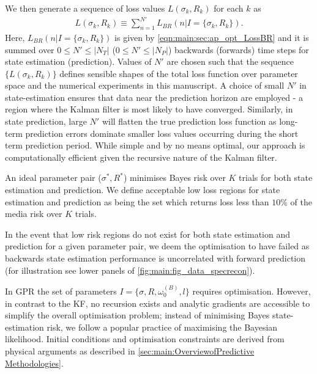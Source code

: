 We then generate a sequence of loss values $L(\sigma_k, R_k)$ for each $k$ as
\begin{align}
L(\sigma_k, R_k) \equiv  \sum_{n=1}^{N'} L_{BR}(n | I= \{\sigma_k, R_k \}).
\end{align}
Here, $L_{BR}(n | I= \{\sigma_k, R_k \})$ is given by \cref{eqn:main:sec:ap_opt_LossBR} and it is summed over $0\leq N'\leq |N_{T}|$  ($0\leq N'\leq |N_{P}|$) backwards (forwards) time steps for state estimation (prediction). Values of $N'$ are chosen such that the sequence $\{L(\sigma_k, R_k) \}$ defines sensible shapes of the total loss function over parameter space and the numerical experiments in this manuscript. A choice of small $N'$ in state-estimation ensures that data near the prediction horizon are employed - a region where the Kalman filter is most likely to have converged.  Similarly, in state prediction, large $N'$ will flatten the true prediction loss function as long-term prediction errors dominate smaller loss values occurring during the short term prediction period.  While simple and by no means optimal, our approach is computationally efficient given the recursive nature of the Kalman filter.%

An ideal parameter pair ($\sigma^*, R^*$) minimises Bayes risk over $K$ trials for both state estimation and prediction.  We define acceptable low loss regions for state estimation and prediction as being the set which returns loss less than $10\%$ of the media risk over $K$ trials.  

In the event that low risk regions do not exist for both state estimation and prediction for a given parameter pair, we deem the optimisation to have failed as backwards state estimation performance is uncorrelated with forward prediction (for illustration see lower panels of \cref{fig:main:fig_data_specrecon}).

In GPR the set of parameters $I = \{\sigma, R, \omega_0^{(B)}, l \}$ requires optimisation.  However, in contrast to the KF, no recursion exists and analytic gradients are accessible to simplify the overall optimisation problem; instead of minimising Bayes state-estimation risk, we follow a popular practice of maximising the Bayesian likelihood. Initial conditions and optimisation constraints are derived from physical arguments as described in \cref{sec:main:OverviewofPredictive Methodologies}.%

